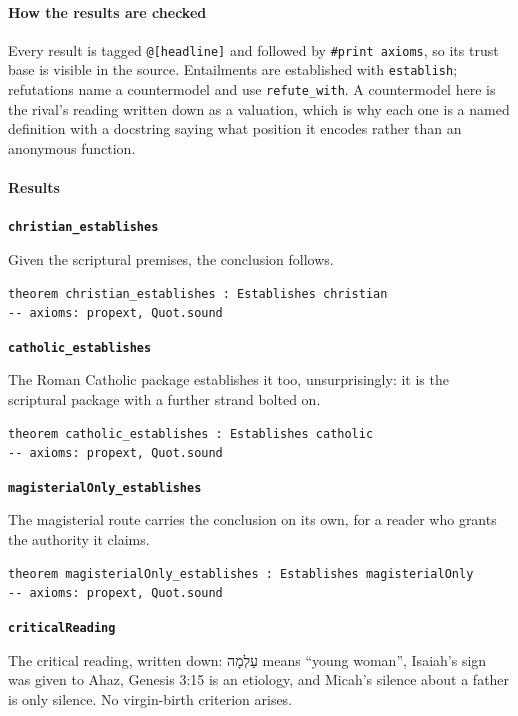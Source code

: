 \documentclass[11pt]{article}
\begin{document}
\paragraph*{How the results are checked}
\leavevmode\par\nobreak
Every result is tagged \texttt{@[headline]} and followed by \texttt{\#print axioms}, so its trust base is visible in the source. Entailments are established with \texttt{establish}; refutations name a countermodel and use \texttt{refute\_\allowbreak{}with}. A countermodel here is the rival’s reading written down as a valuation, which is why each one is a named definition with a docstring saying what position it encodes rather than an anonymous function.

\paragraph*{Results}
\leavevmode\par\nobreak
\par\medskip\noindent\textbf{\texttt{christian\_\allowbreak{}establishes}}\par\nobreak\noindent
Given the scriptural premises, the conclusion follows.

{\small\begin{verbatim}
theorem christian_establishes : Establishes christian
-- axioms: propext, Quot.sound
\end{verbatim}}
\par\medskip\noindent\textbf{\texttt{catholic\_\allowbreak{}establishes}}\par\nobreak\noindent
The Roman Catholic package establishes it too, unsurprisingly: it is the scriptural package with a further strand bolted on.

{\small\begin{verbatim}
theorem catholic_establishes : Establishes catholic
-- axioms: propext, Quot.sound
\end{verbatim}}
\par\medskip\noindent\textbf{\texttt{magisterial\allowbreak{}Only\_\allowbreak{}establishes}}\par\nobreak\noindent
The magisterial route carries the conclusion on its own, for a reader who grants the authority it claims.

{\small\begin{verbatim}
theorem magisterialOnly_establishes : Establishes magisterialOnly
-- axioms: propext, Quot.sound
\end{verbatim}}
\par\medskip\noindent\textbf{\texttt{critical\allowbreak{}Reading}}\par\nobreak\noindent
The critical reading, written down: עַלְמָה means “young woman”, Isaiah’s sign was given to Ahaz, Genesis 3:15 is an etiology, and Micah’s silence about a father is only silence. No virgin-birth criterion arises.
\end{document}
